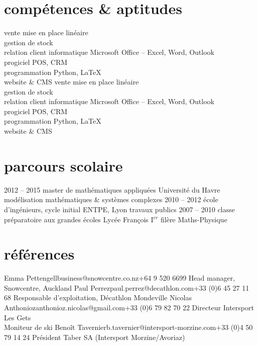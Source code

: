 \documentclass[]{farangoth-cv}
\begin{document}
\section{compétences \& aptitudes}
\begin{entrylist}
  \doubleentry%
  {vente}{%
    mise en place linéaire\\
    gestion de stock\\
    relation client
  }
  {informatique}{%
    Microsoft Office \--- Excel, Word, Outlook\\
    progiciel POS, CRM\\
    programmation Python, \LaTeX\\
    website \& CMS
  }%
   \doubleentry%
  {vente}{%
    mise en place linéaire\\
    gestion de stock\\
    relation client
  }
  {informatique}{%
    Microsoft Office \--- Excel, Word, Outlook\\
    progiciel POS, CRM\\
    programmation Python, \LaTeX\\
    website \& CMS
  }%
  
\end{entrylist}

\section{parcours scolaire}
\begin{entrylist}
  \entry%
  {2012 \--- 2015}
  {master de mathématiques appliquées}
  {Université du Havre}
  {%
    modélisation mathématiques \& systèmes complexes
  }
  \entry%
  {2010 \--- 2012}
  {école d'ingénieurs, cycle initial}
  {ENTPE, Lyon}
  {%
    travaux publics
  }
  \entry%
  {2007 \--- 2010}
  {classe préparatoire aux grandes écoles}
  {Lycée François I$^{er}$}
  {%
    filère Maths\--Physique
  }
\end{entrylist}

\section{références}
\begin{entrylist}
  \doubleentryref%
  {Emma Pettengell}{business@snowcentre.co.nz}{+64 9 520 6699}
  {%
    Head manager, Snowcentre, Auckland 
  }
  {Paul Perrez}{paul.perrez@decathlon.com}{+33 (0)6 45 27 11 68}
  {%
    Responsable d'exploitation, Décathlon Mondeville
  }
  \doubleentryref%
  {Nicolas Anthonioz}{anthonioz.nicolas@gmail.com}{+33 (0)6 79 82 70 22}
  {%
    Directeur Intersport Les Gets\\
    Moniteur de ski
  }
  {Benoît Tavernier}{b.tavernier@intersport-morzine.com}{+33 (0)4 50 79 14 24}
  {%
    Président Taber SA (Intersport Morzine/Avoriaz) 
  }
\end{entrylist}
\end{document}

